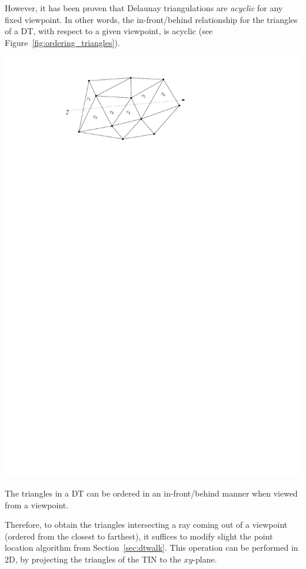 However, it has been proven that Delaunay triangulations are \emph{acyclic} for any fixed viewpoint. 
In other words, the in-front/behind relationship for the triangles of a DT, with respect to a given viewpoint, is acyclic (see Figure~\ref{fig:ordering_triangles}).
\begin{marginfigure}
  \centering
  \includegraphics[width=\linewidth]{ordering_triangles.pdf}
  \caption{The triangles in a DT can be ordered in an in-front/behind manner when viewed from a viewpoint.}%
  \label{fig:ordering_triangles}
\end{marginfigure}
Therefore, to obtain the triangles intersecting a ray coming out of a viewpoint (ordered from the closest to farthest), it suffices to modify slight the point location algorithm from Section~\ref{sec:dtwalk}.
This operation can be performed in 2D, by projecting the triangles of the TIN to the $xy$-plane.

